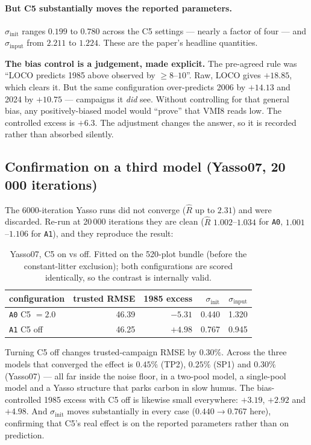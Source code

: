 \documentclass[11pt]{article}
\newcommand{\sinit}{\sigma_{\mathrm{init}}}
\newcommand{\sinput}{\sigma_{\mathrm{input}}}
\begin{document}
\paragraph{But C5 substantially moves the reported parameters.} $\sinit$ ranges $0.199$ to
$0.780$ across the C5 settings --- nearly a factor of four --- and $\sinput$ from $2.211$ to
$1.224$. These are the paper's headline quantities.

\begin{caveat}
\textbf{The bias control is a judgement, made explicit.} The pre-agreed rule was ``LOCO predicts
1985 above observed by $\geq 8$--$10$''. Raw, LOCO gives $+18.85$, which clears it. But the same
configuration over-predicts 2006 by $+14.13$ and 2024 by $+10.75$ --- campaigns it \emph{did}
see. Without controlling for that general bias, any positively-biased model would ``prove'' that
VMI8 reads low. The controlled excess is $+6.3$. The adjustment changes the answer, so it is
recorded rather than absorbed silently.
\end{caveat}

\subsection{Confirmation on a third model (Yasso07, 20\,000 iterations)}
The 6000-iteration Yasso runs did not converge ($\hat{R}$ up to $2.31$) and were discarded.
Re-run at 20\,000 iterations they are clean ($\hat{R}$ $1.002$--$1.034$ for \texttt{A0},
$1.001$--$1.106$ for \texttt{A1}), and they reproduce the result:

\begin{table}[H]\centering\small
\caption{Yasso07, C5 on vs off. Fitted on the 520-plot bundle (before the constant-litter
exclusion); both configurations are scored identically, so the contrast is internally valid.}
\begin{tabular}{lrrrr}\toprule
configuration & trusted RMSE & 1985 excess & $\sinit$ & $\sinput$\\\midrule
\texttt{A0} C5 $=2.0$ & 46.39 & $-5.31$ & 0.440 & 1.320\\
\texttt{A1} C5 off    & 46.25 & $+4.98$ & 0.767 & 0.945\\\bottomrule
\end{tabular}
\end{table}

\noindent Turning C5 off changes trusted-campaign RMSE by $0.30\%$. Across the three models
that converged the effect is $0.45\%$ (TP2), $0.25\%$ (SP1) and $0.30\%$ (Yasso07) --- all far
inside the noise floor, in a two-pool model, a single-pool model and a Yasso structure that
parks carbon in slow humus. The bias-controlled 1985 excess with C5 off is likewise small
everywhere: $+3.19$, $+2.92$ and $+4.98$. And $\sinit$ moves substantially in every case
($0.440 \rightarrow 0.767$ here), confirming that C5's real effect is on the reported
parameters rather than on prediction.
\end{document}

